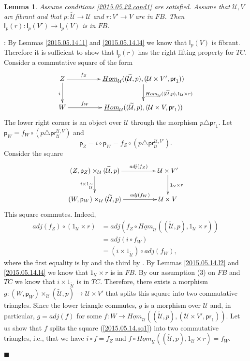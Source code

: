 \documentclass[12pt]{article}
\numberwithin{equation}{section}
\newenvironment{eq}{\begin{equation}}{\end{equation}}
\newenvironment{myproof}{{\bf Proof}:}{$\blacksquare$ \vskip 5mm }
\newtheorem{lemma}[proposition]{Lemma}
\newcommand{\sr}{\rightarrow}
\newcommand{\uu}{\underline}
\newcommand{\iHom}{\uu{Hom}}
\newcommand{\wt}{\widetilde}
\newcommand{\id}{1}            %
\newcommand{\p}{\mathsf{p}}
\newcommand{\U}{\mathcal{U}}
\newcommand{\I}{\mathsf{I}}
\newcommand{\pr}{\mathsf{pr}}
\begin{document}
%
\begin{lemma}
  \label{2015.05.14.l3}
  Assume conditions \ref{2015.05.22.cond1} are satisfied.
  Assume that $\U,V$ are fibrant and that $p:\wt{\U}\sr \U$
  and $r:V'\sr V$ are in $FB$. Then $\I_p(r):\I_p(V')\sr \I_p(V)$ is in $FB$.
\end{lemma}
%
\begin{myproof}
By Lemmas \ref{2015.05.14.l1} and \ref{2015.05.14.l4} we know that $\I_p(V)$ is
fibrant. Therefore it is sufficient to show that $\I_p(r)$ has the right lifting
property for $TC$. Consider a commutative square of the form
%
\begin{eq}
\label{2015.05.14.sq1}
\begin{xy}
          \xymatrix@C=4pc{ Z \ar[r]^-{f_Z} \ar[d]_{i} &
            \iHom_\U((\wt{\U},p),(\U\times V',\pr_1))
            \ar[d]^{\iHom_\U((\wt{\U},p), \id_\U\times r)}\\ W \ar[r]^-{f_W} &
            \iHom_\U((\wt{\U},p), (\U\times V, \pr_1)) }
\end{xy}
\end{eq}%
%
The lower right corner is an object over $\U$ through the morphism $p\triangle
\pr_1$. Let $\p_W=f_W\circ (p\triangle \pr^{\U,V}_\U)$ and
%
\[ \p_Z=i\circ \p_W=f_Z\circ (p\triangle \pr^{\U,V'}_\U) . \]
%
Consider the square
%
\begin{eq}
\label{2015.05.14.sq2}
\begin{xy}
          \xymatrix@C=4pc{ (Z,\p_Z)\times_\U (\wt{\U},p) \ar[r]^-{adj(f_Z)}
            \ar[d]_{i\times \id_{\wt{\U}}} & \U\times V' \ar[d]^{\id_\U\times
              r}\\ (W,\p_W)\times_\U (\wt{\U},p) \ar[r]^-{adj(f_W)} & \U\times V }
\end{xy}
\end{eq}%
%
This square commutes. Indeed,
%
\begin{align*}
  adj(f_Z)\circ (\id_\U\times r )
  & = adj(f_Z\circ \iHom_\U((\wt{\U},p), \id_\U\times r)) \\
  & = adj(i\circ f_W) \\
  & = (i\times \id_{\wt{\U}})\circ adj (f_W),
\end{align*}
%
where the first equality is by \cite[Lemma 8.7(1)]{fromunivwithPi} and the
third by \cite[Lemma 8.7(3)]{fromunivwithPi}. By Lemmas \ref{2015.05.14.l2} and
\ref{2015.05.14.l4} we know that $\id_\U\times r$ is in $FB$. By our assumption
(3) on $FB$ and $TC$ we know that $i\times \id_{\wt{\U}}$ is in $TC$. Therefore,
there exists a morphism $g:(W,\p_W)\times_\U (\wt{\U},p) \sr \U\times V'$ that
splits this square into two commutative triangles. Since the lower triangle
commutes, $g$ is a morphism over $\U$ and, in particular, $g=adj(f)$ for some
$f:W\sr \iHom_\U((\wt{\U},p),(\U\times V',\pr_1))$. Let us show that $f$ splits
the square (\ref{2015.05.14.sq1}) into two commutative triangles, i.e., that we
have $i\circ f= f_Z$ and $f\circ \iHom_\U((\wt{\U},p), \id_\U\times r)=f_W$.


\end{myproof}
\end{document}
